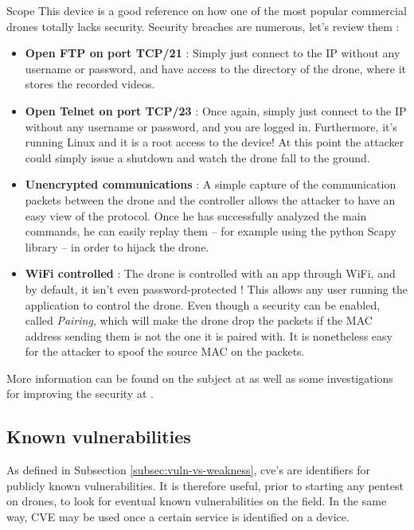\begin{chaptercover}{Scope}
This device is a good reference on how one of the most popular commercial drones totally lacks security. Security breaches are numerous, let’s review them :
\begin{itemize}
  \item \textbf{Open FTP on port TCP/21} : Simply just connect to the IP without any username or password, and have access to the directory of the drone, where it stores the recorded videos.
  \item \textbf{Open Telnet on port TCP/23} : Once again, simply just connect to the IP without any username or password, and you are logged in. Furthermore, it's running Linux and it is a root access to the device! At this point the attacker could simply issue a shutdown and watch the drone fall to the ground.
  \item \textbf{Unencrypted communications} : A simple capture of the communication packets between the drone and the controller allows the attacker to have an easy view of the protocol. Once he has successfully analyzed the main commands, he can easily replay them -- for example using the python Scapy library -- in order to hijack the drone.
  \item \textbf{WiFi controlled} : The drone is controlled with an app through WiFi, and by default, it isn’t even password-protected ! This allows any user running the application to control the drone. Even though a security can be enabled, called \textit{Pairing}, which will make the drone drop the packets if the MAC address sending them is not the one it is paired with. It is nonetheless easy for the attacker to spoof the source MAC on the packets.
\end{itemize}

More information can be found on the subject at \cite{github-drone-hacking} as well as some investigations for improving the security at \cite{hacking-securing-ardrone2}.

\subsection{Known vulnerabilities}

As defined in Subsection \ref{subsec:vuln-vs-weakness}, \acrshort{cve}'s are identifiers for publicly known vulnerabilities. It is therefore useful, prior to starting any pentest on drones, to look for eventual known vulnerabilities on the field. In the same way, CVE may be used once a certain service is identified on a device.


\end{chaptercover}
